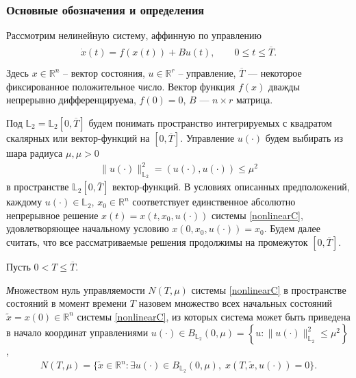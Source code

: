 \documentclass[../main.tex]{subfiles}
\begin{document}
	\subsubsection{Основные обозначения и определения}
	Рассмотрим нелинейную систему, аффинную по управлению
	\begin{gather}\label{nonlinearC}
		\begin{gathered}
			\dot{x}(t)=f(x(t))+B u(t), \qquad 0 \leqslant t \leqslant   \overline{T}. \\
		\end{gathered}
	\end{gather}
	Здесь $ x \in \mathbb{R}^n $ -- вектор состояния, $ u \in \mathbb{R}^r $ -- управление,  $ \overline{
	T} $ --- некоторое фиксированное положительное число. Вектор функция $f(x)$ дважды непрерывно дифференцируема, $f(0)=0$, $B$ --- $n \times r$ матрица.
	
	
	Под $ \mathbb{L}_2 = \mathbb{L}_2[0,\overline{T}]  $ будем понимать  пространство интегрируемых с квадратом скалярных или вектор-функций  на $ [0,\overline{T}] $. 
	 Управление $ u(\cdot) $ будем выбирать из шара радиуса $ \mu, \mu > 0 $
	\begin{gather}\label{constrC}
		\lVert u(\cdot)\rVert^2_{\mathbb{L}_2} = \left(u(\cdot),u(\cdot) \right) \leqslant \mu^2
	\end{gather}
	в пространстве $\mathbb{L}_2[0,\overline{T}]$ вектор-функций.
	В условиях описанных предположений, каждому $ u(\cdot) \in \mathbb{L}_2 $, $x_0 \in  \mathbb{R}^n  $ соответствует единственное абсолютно непрерывное решение $ x(t)=x(t,x_0, u(\cdot)) $ системы \eqref{nonlinearC}, удовлетворяющее начальному условию  $ x(0,x_0, u(\cdot)) = x_0$. Будем далее считать, что все рассматриваемые решения продолжимы  на промежуток $[0,\overline{T}]$.  
	
	
	
	Пусть $ 0 <  T \leqslant \overline{T} $.
	\begin{definition}
		{\textit Множеством нуль управляемости} $ N(T,\mu) $ системы \eqref{nonlinearC}  в  пространстве состояний в момент времени $ T $ назовем
		множество всех начальных состояний $ \widetilde{x}=x(0) \in \mathbb{R}^n $ системы \eqref{nonlinearC},  из которых система может быть приведена в начало координат управлениями
		$ u(\cdot) \in B_{\mathbb{L}_2}(0,\mu)  =\left\lbrace u:\lVert u(\cdot)\rVert^2_{\mathbb{L}_2} \leqslant \mu^2\right\rbrace  $,
		\begin{gather*}
			N(T,\mu)=\{\widetilde{x}\in \mathbb{R}^n:\exists u(\cdot)\in B_{\mathbb{L}_2}(0,\mu),\; x( T,\widetilde{x},u(\cdot)) = 0\}.
		\end{gather*}
	\end{definition}
	
\end{document}
